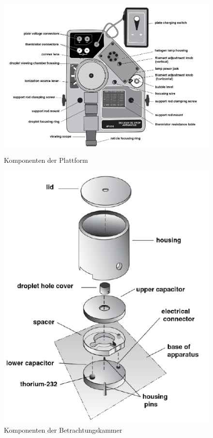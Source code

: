 \begin{figure}[h]
	\centering
	\begin{minipage}[t]{0.45\textwidth}
		\centering
		\includegraphics[scale=0.5]{bilder/pdf/plattformKomponenten.pdf}
		\caption{Komponenten der Plattform \parencite[3]{instructionManualHalogen}}
		\label{fig:plattformKomp}
	\end{minipage}
	\hfill
	\begin{minipage}[t]{0.45\textwidth}
		\centering
		\includegraphics[width=\textwidth]{bilder/pdf/BetrachtungsKammerKomponenten.pdf}
		\caption{Komponenten der Betrachtungskammer \parencite[4]{instructionManualHalogen}}
		\label{fig:betrachtKomp}
	\end{minipage}
\end{figure}






